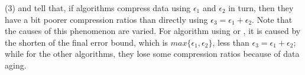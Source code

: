 {%

\ni (3)  and  tell that, if algorithms compress data using $\epsilon_1$ and $\epsilon_2$ in turn, then they have a bit poorer compression ratios than directly using $\epsilon_3=\epsilon_1 + \epsilon_2$.
Note that the causes of this phenomenon are varied. For algorithm \dpa using \ped or \sed, it is caused by the shorten of the final error bound, which is $max\{\epsilon_1, \epsilon_2\}$, less than $\epsilon_3=\epsilon_1 + \epsilon_2$; while for the other algorithms, they lose some compression ratios because of data aging.





 	



}
